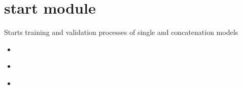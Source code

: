 \documentclass[letterpaper,10pt,english]{sphinxmanual}
\begin{document}
\sphinxstepscope


\section{start module}
\label{\detokenize{start:module-start}}\label{\detokenize{start:start-module}}\label{\detokenize{start::doc}}

\begin{fulllineitems}
\label{\detokenize{start:start.main}}
\pysigstartsignatures
{}
\pysigstopsignatures
\sphinxAtStartPar
Starts training and validation processes of single and concatenation models

\end{fulllineitems}

\begin{itemize}
\item {} \begin{quote}\begin{description}
\sphinxAtStartPar
{}

\end{description}\end{quote}

\item {} \begin{quote}\begin{description}
\sphinxAtStartPar
{}

\end{description}\end{quote}

\item {} \begin{quote}\begin{description}
\sphinxAtStartPar
{}

\end{description}\end{quote}

\end{itemize}
\end{document}
